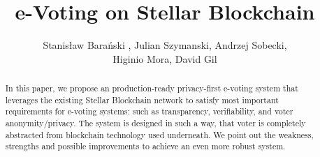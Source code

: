 \documentclass[runningheads]{llncs}
\begin{document}
%
\title{e-Voting on Stellar Blockchain}
%
%
\author{Stanisław Barański
, Julian Szymanski, Andrzej Sobecki, \\
Higinio Mora, David Gil}

%

\maketitle              %
%
\begin{abstract}
In this paper, we propose an production-ready privacy-first e-voting system that leverages the existing Stellar Blockchain network 
to satisfy most important requirements for e-voting systems: such as transparency, verifiability, and voter anonymity/privacy. The system is designed in such a way, that voter is completely abstracted from blockchain technology used underneath. We point out the weakness, strengths and possible improvements to achieve an even more robust system. 





 
\end{abstract}
\end{document}
